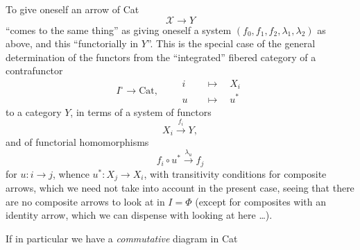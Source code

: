\documentclass[11pt]{article}
\newcommand{\msp}[1]{\marginpar{\footnotesize [#1]}}
\newcommand{\Cat}{\mathrm{Cat}}
\newcommand{\cX}{\mathcal{X}}
\begin{document}
\msp{page 129}
To give oneself an arrow of Cat
\[
\cX \longrightarrow Y
\]
``comes to the same thing'' as giving oneself a system $(f_0, f_1, f_2, \lambda_1, \lambda_2)$ as above, and this ``functorially in $Y$''. This is the special case of the general determination of the functors from the ``integrated'' fibered category of a contrafunctor
\[
I^{\circ} \longrightarrow \Cat, \qquad
\begin{aligned}
i &\quad\longmapsto\quad X_i\\
u &\quad\longmapsto\quad u^*
\end{aligned}
\]
to a category $Y$, in terms of a system of functors
\[
X_i \xrightarrow{f_i} Y,
\]
and of functorial homomorphisms
\[
f_i\circ u^* \xrightarrow{\lambda_u} f_j
\]
for $u : i \longrightarrow j$, whence $u^* : X_j \longrightarrow X_i$, with transitivity conditions for composite arrows, which we need not take into account in the present case, seeing that there are no composite arrows to look at in $I = \Phi$ (except for composites with an identity arrow, which we can dispense with looking at here \dots).

\msp{page 130}
If in particular we have a \textit{commutative} diagram in Cat
\end{document}
